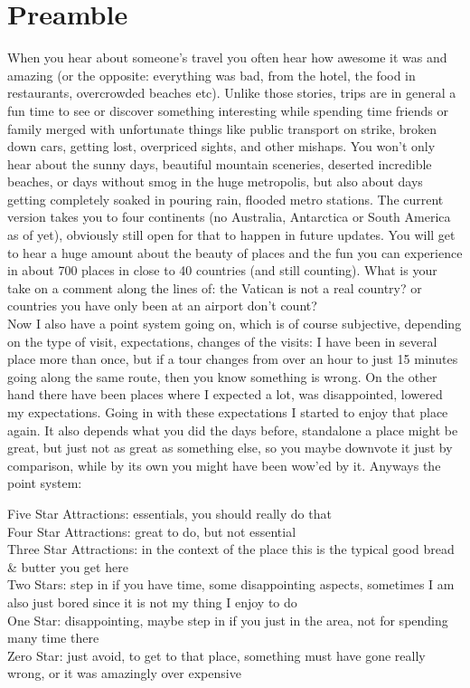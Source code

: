 \chapter{Preamble}

When you hear about someone's travel you often hear how awesome it was and amazing (or the opposite: everything was bad, from the hotel, the food in restaurants, overcrowded beaches etc). Unlike those stories, trips are in general a fun time to see or discover something interesting while spending time friends or family merged with unfortunate things like public transport on strike, broken down cars, getting lost, overpriced sights, and other mishaps. You won't only hear about the sunny days, beautiful mountain sceneries, deserted incredible beaches, or days without smog in the huge metropolis, but also about days getting completely soaked in pouring rain, flooded metro stations. The current version takes you to four continents (no Australia, Antarctica or South America as of yet), obviously still open for that to happen in future updates. You will get to hear a huge amount about the beauty of places and the fun you can experience in about 700 places in close to 40 countries (and still counting). What is your take on a comment along the lines of: the Vatican is not a real country? or countries you have only been at an airport don't count?\\

Now I also have a point system going on, which is of course subjective, depending on the type of visit, expectations, changes of the visits: I have been in several place more than once, but if a tour changes from over an hour to just 15 minutes going along the same route, then you know something is wrong. On the other hand there have been places where I expected a lot, was disappointed, lowered my expectations. Going in with these expectations I started to enjoy that place again. It also depends what you did the days before, standalone a place might be great, but just not as great as something else, so you maybe downvote it just by comparison, while by its own you might have been wow'ed by it. Anyways the point system:

Five Star Attractions: essentials, you should really do that\\
Four Star Attractions: great to do, but not essential\\
Three Star Attractions: in the context of the place this is the typical good bread \& butter you get here\\
Two Stars: step in if you have time, some disappointing aspects, sometimes I am also just bored since it is not my thing I enjoy to do\\
One Star: disappointing, maybe step in if you just in the area, not for spending many time there\\
Zero Star: just avoid, to get to that place, something must have gone really wrong, or it was amazingly over expensive\\
